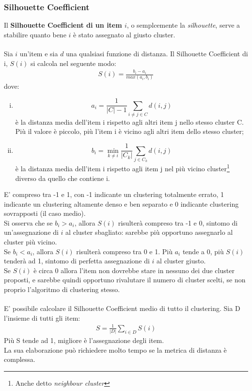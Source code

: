 \subsubsection{Silhouette Coefficient}
Il \textbf{Silhouette Coefficient di un item $i$}, o semplcemente la \textit{silhouette}, serve a stabilire quanto bene $i$ è stato assegnato al giusto cluster.\\
\\
Sia $i$ un'item e sia $d$ una qualsiasi funzione di distanza. Il Silhouette Coefficient di i, $S(i)$ si calcola nel seguente modo:
\begin{align}
S(i) = \frac{b_i - a_i}{max(a_i, b_i)}
\end{align}
dove:
\begin{enumerate}[(i)]
	\item $$ a_i = \frac{1}{|C|-1}\sum_{i\ne j\in C} d(i,j)$$ è la distanza media dell'item i rispetto agli altri item j nello stesso cluster C.\\
	Più il valore è piccolo, più l'item i è vicino agli altri item dello stesso cluster;
	\item $$ b_i = \min_{k\ne i} \frac{1}{|C_k|}\sum_{j \in C_k} d(i,j)$$ è la distanza media dell'item i rispetto agli item j nel più vicino cluster\footnote{Anche detto \textit{neighbour cluster}} diverso da quello che contiene i.
\end{enumerate}
E' compreso tra -1 e 1, con -1 indicante un clustering totalmente errato, 1 indicante un clustering altamente denso e ben separato e 0 indicante clustering sovrapposti (il caso medio).\\
Si osserva che se $b_i > a_i$, allora $S(i)$ risulterà compreso tra -1 e 0, sintomo di un'assegnazione di $i$ al cluster sbagliato: sarebbe più opportuno assegnarlo al cluster più vicino.\\
Se $b_i < a_i$, allora $S(i)$ risulterà compreso tra 0 e 1. Più $a_i$ tende a 0, più $S(i)$ tenderà ad 1, sintomo di perfetta assegnazione di $i$ al cluster giusto.\\
Se $S(i)$ è circa 0 allora l'item non dovrebbe stare in nessuno dei due cluster proposti, e sarebbe quindi opportuno rivalutare il numero di cluster scelti, se non proprio l'algoritmo di clustering stesso.\\
\\
E' possibile calcolare il Silhouette Coefficient medio di tutto il clustering. Sia D l'insieme di tutti gli item:
\begin{align}
S = \frac{1}{|D|} \sum_{i \in D} S(i)
\end{align}
Più S tende ad 1, migliore è l'assegnazione degli item.\\
La sua elaborazione può richiedere molto tempo se la metrica di distanza è complessa.

